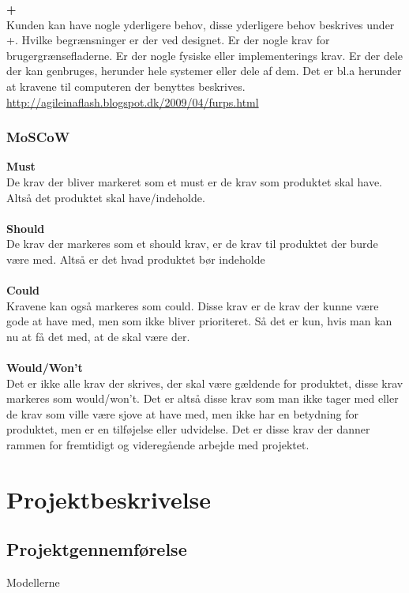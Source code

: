 \textbf{+}\\
Kunden kan have nogle yderligere behov, disse yderligere behov beskrives under +. Hvilke begrænsninger er der ved designet. Er der nogle krav for brugergrænsefladerne. Er der nogle fysiske eller implementerings krav. Er der dele der kan genbruges, herunder hele systemer eller dele af dem. Det er bl.a herunder at kravene til computeren der benyttes beskrives.\\
\url{http://agileinaflash.blogspot.dk/2009/04/furps.html}

\subsection{MoSCoW}
\textbf{Must}\\
De krav der bliver markeret som et must er de krav som produktet skal have. Altså det produktet skal have/indeholde.\\\\
\textbf{Should}\\
De krav der markeres som et should krav, er de krav til produktet der burde være med. Altså er det hvad produktet bør indeholde\\\\
\textbf{Could}\\
Kravene kan også markeres som could. Disse krav er de krav der kunne være gode at have med, men som ikke bliver prioriteret. Så det er kun, hvis man kan nu at få det med, at de skal være der.\\\\
\textbf{Would/Won't}\\
Det er ikke alle krav der skrives, der skal være gældende for produktet, disse krav markeres som would/won't. Det er altså disse krav som man ikke tager med eller de krav som ville være sjove at have med, men ikke har en betydning for produktet, men er en tilføjelse eller udvidelse. Det er disse krav der danner rammen for fremtidigt og videregående arbejde med projektet.
\chapter{Projektbeskrivelse}
\section{Projektgennemførelse}
Modellerne
